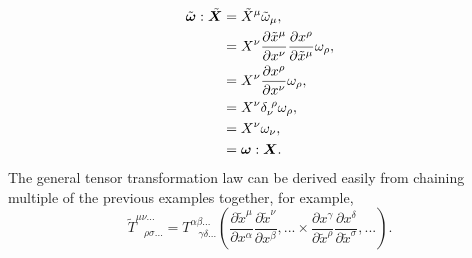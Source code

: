 \begin{align}
\tilde{\boldsymbol \omega} : \tilde{\boldsymbol X} &= \tilde{X}^\mu \tilde{\omega}_\mu ,\\
                                   &= {X}^\nu \frac{\partial \tilde{x}^\mu}{\partial x^\nu}   \frac{\partial x^\rho}{\partial \tilde{x}^\mu}\omega_\rho, \\
                                   &=X^\nu \frac{\partial x^\rho}{\partial x^\nu} \omega_\rho , \\
                                   &=X^\nu \delta_\nu^{\,\,\rho} \omega_\rho , \\
                                   &=X^\nu\omega_\nu,\\
                                   &= \boldsymbol{\omega}:\boldsymbol{X}.
\end{align}
The general tensor transformation law can be derived easily from chaining multiple of the previous examples together, for example,
\begin{equation} \label{intro:eq:tensortrans}
\tilde{T}^{\mu\nu...}_{\,\,\,\,\,\rho\sigma...} = T^{\alpha\beta...}_{\,\,\,\,\,\gamma\delta...}\left(
\frac{\partial \tilde{x}^\mu}{\partial x^\alpha}\frac{\partial \tilde{x}^\nu}{\partial x^\beta},...\times\frac{\partial x^\gamma}{\partial \tilde{x}^\rho}\frac{\partial x^\delta}{\partial \tilde{x}^\sigma},...\right).
\end{equation}




